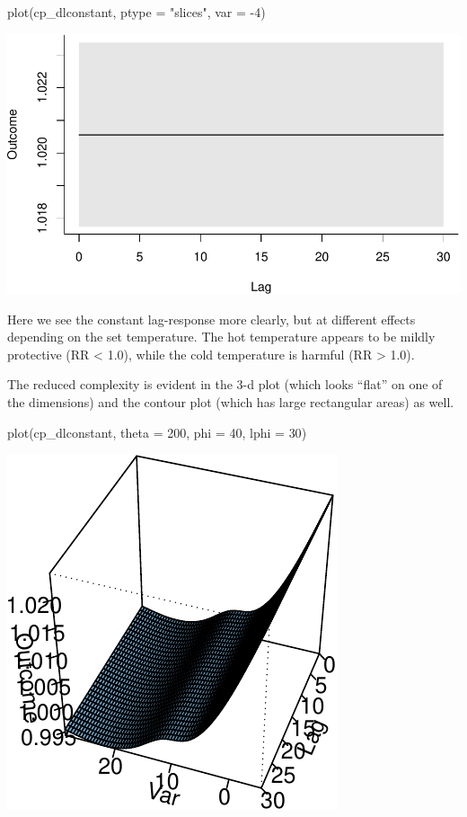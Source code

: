\documentclass[
]{book}
\newenvironment{Shaded}{\begin{snugshade}}{\end{snugshade}}
\newcommand{\AttributeTok}[1]{\textcolor[rgb]{0.77,0.63,0.00}{#1}}
\newcommand{\DecValTok}[1]{\textcolor[rgb]{0.00,0.00,0.81}{#1}}
\newcommand{\FunctionTok}[1]{\textcolor[rgb]{0.00,0.00,0.00}{#1}}
\newcommand{\NormalTok}[1]{#1}
\newcommand{\SpecialCharTok}[1]{\textcolor[rgb]{0.00,0.00,0.00}{#1}}
\newcommand{\StringTok}[1]{\textcolor[rgb]{0.31,0.60,0.02}{#1}}
\begin{document}
\begin{Shaded}
\begin{Highlighting}[]
\FunctionTok{plot}\NormalTok{(cp\_dlconstant, }\AttributeTok{ptype =} \StringTok{"slices"}\NormalTok{, }\AttributeTok{var =} \SpecialCharTok{{-}}\DecValTok{4}\NormalTok{)}
\end{Highlighting}
\end{Shaded}

\includegraphics{adv_epi_analysis_files/figure-latex/unnamed-chunk-112-2.pdf}

Here we see the constant lag-response more clearly, but at different effects depending on the set temperature. The hot temperature appears to be mildly protective (RR \textless{} 1.0), while the cold temperature is harmful (RR \textgreater{} 1.0).

The reduced complexity is evident in the 3-d plot (which looks ``flat'' on one of the dimensions) and the contour plot (which has large rectangular areas) as well.

\begin{Shaded}
\begin{Highlighting}[]
\FunctionTok{plot}\NormalTok{(cp\_dlconstant, }\AttributeTok{theta =} \DecValTok{200}\NormalTok{, }\AttributeTok{phi =} \DecValTok{40}\NormalTok{, }\AttributeTok{lphi =} \DecValTok{30}\NormalTok{)}
\end{Highlighting}
\end{Shaded}

\includegraphics{adv_epi_analysis_files/figure-latex/unnamed-chunk-113-1.pdf}
\end{document}
